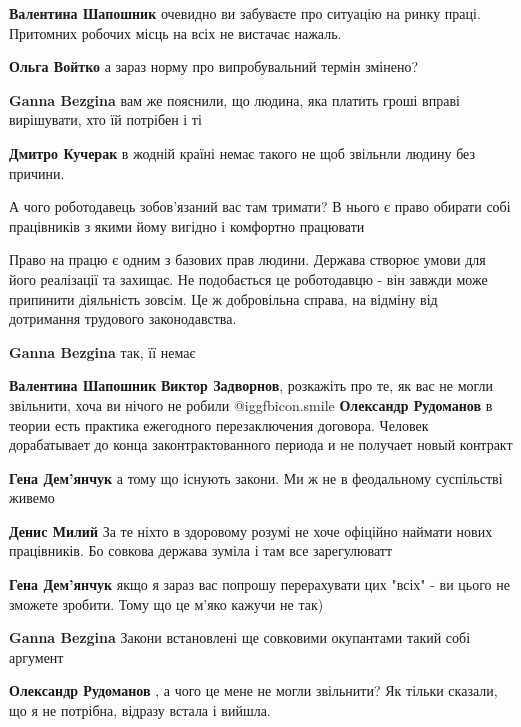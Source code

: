 \begin{itemize}
\begin{itemize}
\textbf{Валентина Шапошник} очевидно ви забуваєте про ситуацію на ринку праці. Притомних робочих місць на всіх не вистачає нажаль.

\textbf{Ольга Войтко} а зараз норму про випробувальний термін змінено?

\textbf{Ganna Bezgina} вам же пояснили, що людина, яка платить гроші вправі вирішувати, хто їй потрібен і ті

\textbf{Дмитро Кучерак} в жодній країні немає такого не щоб звільнли людину без причини.

А чого роботодавець зобов'язаний вас там тримати? В нього є право обирати собі працівників з якими йому вигідно і комфортно працювати


Право на працю є одним з базових прав людини. Держава створює умови для його
реалізації та захищає. Не подобається це роботодавцю - він завжди може
припинити діяльність зовсім. Це ж добровільна справа, на відміну від дотримання
трудового законодавства.


\textbf{Ganna Bezgina} так, її немає


\textbf{Валентина Шапошник} \textbf{Виктор Задворнов}, розкажіть про те, як вас не могли звільнити, хоча ви нічого не робили  @igg{fbicon.smile} 
\textbf{Олександр Рудоманов} в теории есть практика ежегодного перезаключения договора. Человек дорабатывает до конца законтрактованного периода и не получает новый контракт

\textbf{Гена Дем'янчук} а тому що існують закони. Ми ж не в феодальному суспільстві живемо

\textbf{Денис Милий} За те ніхто в здоровому розумі не хоче офіційно наймати нових працівників. Бо совкова держава зуміла і там все зарегулюватт

\textbf{Гена Дем'янчук} якщо я зараз вас попрошу перерахувати цих "всіх" - ви цього не зможете зробити. Тому що це м'яко кажучи не так)

\textbf{Ganna Bezgina} Закони встановлені ще совковими окупантами такий собі аргумент

\textbf{Олександр Рудоманов} , а чого це мене не могли звільнити? Як тільки сказали, що я не потрібна, відразу встала і вийшла.


\end{itemize}
\end{itemize}
